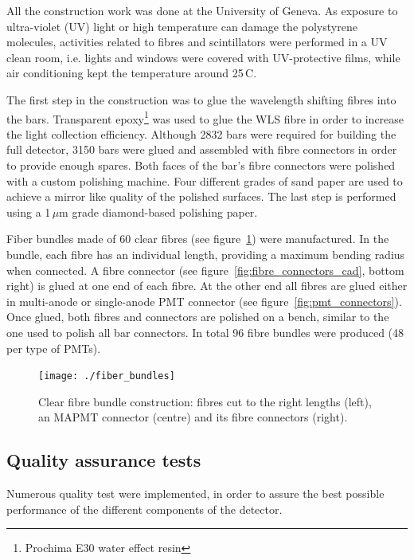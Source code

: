 \documentclass[a4paper,11pt]{article}
\begin{document}
All the construction work was done at the University of Geneva. As exposure to ultra-violet (UV) light or high temperature
can damage the polystyrene molecules,
activities related to fibres and scintillators were performed in a UV clean room, i.e. lights and windows were covered with UV-protective films, while air conditioning
kept the temperature around 25\,\degree C. 

The first step in the construction was to glue the wavelength shifting fibres
into the bars. Transparent epoxy\footnote{Prochima E30 water effect resin} was used to glue the WLS fibre in order to increase the light collection
efficiency. Although 2832 bars were required for building the full detector, 3150 bars were glued and assembled with fibre connectors in
order to provide enough spares. Both faces of the bar's fibre connectors were polished with a custom polishing machine. Four
different grades of sand paper are used to achieve a mirror like quality of the polished surfaces. The last step is performed using a 1\,$\mu$m grade
diamond-based polishing paper.

Fiber bundles made of 60 clear fibres (see figure~\ref{fig:fibre_bundles}) were manufactured. In the bundle, each fibre has an individual length, providing
a maximum bending radius when connected. A fibre connector (see figure~\ref{fig:fibre_connectors_cad}, bottom right) is glued at one end of each fibre. At
the other end all fibres are glued either in multi-anode or single-anode PMT connector (see figure~\ref{fig:pmt_connectors}). Once glued, both fibres and
connectors are polished on a bench, similar to the one used to polish all bar connectors. In total 96 fibre bundles were produced (48 per type of PMTs).

\begin{figure}[htp!]
 \centering
 \texttt{[image: ./fiber\_bundles]}
 \caption[Clear fibre bundles]{Clear fibre bundle construction: fibres cut to the right lengths (left), an MAPMT connector (centre) and its fibre connectors (right).}
 \label{fig:fibre_bundles}
\end{figure}

\subsection{Quality assurance tests}\label{construction:subsec:quality_tests}

Numerous quality test were implemented, in order to assure the best possible performance of the different components of the detector. 
\end{document}
